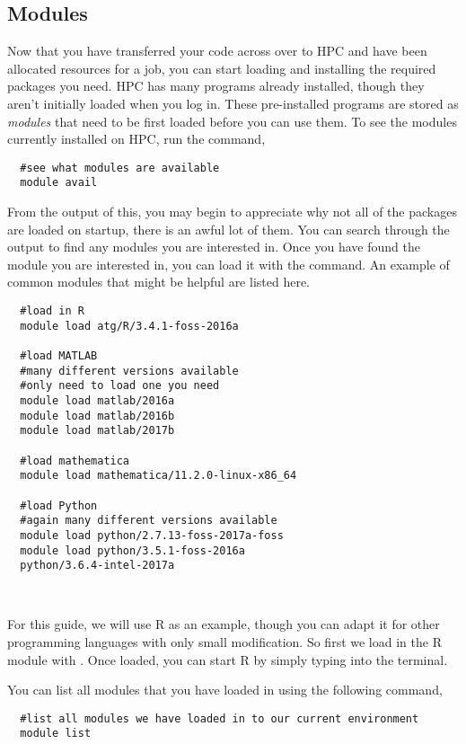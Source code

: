 \subsection{Modules}
Now that you have transferred your code across over to HPC and have been allocated resources for a job, you can start loading and installing the required packages you need. HPC has many programs already installed, though they aren't initially loaded when you log in. These pre-installed programs are stored as \textit{modules} that need to be first loaded before you can use them. To see the modules currently installed on HPC, run the command,
%
%
\\
\par
\begin{verbatim}
  #see what modules are available
  module avail
\end{verbatim}
From the output of this, you may begin to appreciate why not all of the packages are loaded on startup, there is an awful lot of them. You can search through the output to find any modules you are interested in. Once you have found the module you are interested in, you can load it with the  command. An example of common modules that might be helpful are listed here.
%
\\
%
\begin{verbatim}
  #load in R
  module load atg/R/3.4.1-foss-2016a

  #load MATLAB
  #many different versions available
  #only need to load one you need
  module load matlab/2016a
  module load matlab/2016b
  module load matlab/2017b

  #load mathematica
  module load mathematica/11.2.0-linux-x86_64

  #load Python
  #again many different versions available
  module load python/2.7.13-foss-2017a-foss
  module load python/3.5.1-foss-2016a
  python/3.6.4-intel-2017a
\end{verbatim}
%
\\
\par
%
For this guide, we will use R as an example, though you can adapt it for other programming languages with only small modification. So first we load in the R module with . Once loaded, you can start R by simply typing  into the terminal.
%
%
%
\par
You can list all modules that you have loaded in using the following command,
\\
\par
\begin{verbatim}
  #list all modules we have loaded in to our current environment
  module list
\end{verbatim}


